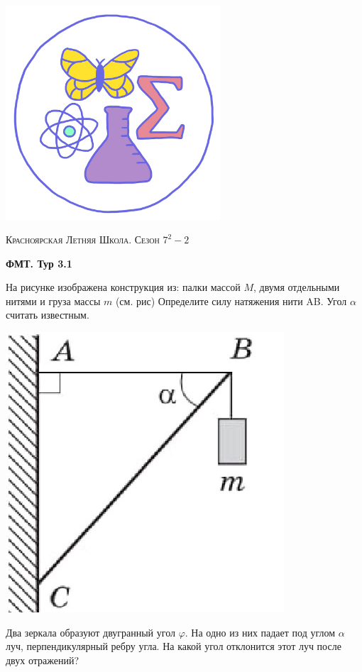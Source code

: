 \colorbox{white!10!}{
    \begin{minipage}{0.2\textwidth}
       \begin{flushleft}
        \includegraphics[width = 0.6\textwidth]{Эмблема.png}
       \end{flushleft}
    \end{minipage}
    \begin{minipage}[t]{0.7 \textwidth}
        \begin{center}
            {\huge \textsc{Красноярская Летняя Школа. Сезон $7^2 - 2$}}
            \vspace{0.25cm}
            
            { \huge \textbf{ФМТ. Тур 3.1}}
        \end{center}
        \vspace{0.05cm}
    \end{minipage}
}

\begin{enumerate}
    \parbox[b]{.7\textwidth}{%
    \item На рисунке изображена конструкция из: палки массой $M$, двумя отдельными нитями и груза массы $m$ (см. рис) 
    Определите силу натяжения нити AB. Угол $\alpha$ считать известным.
    }\hfill\includegraphics[width=.145\textwidth]{pictures/Tur_3.png}
	
 
    \item Два зеркала образуют двугранный угол $\varphi$. На одно из них падает под углом $\alpha$ луч, перпендикулярный ребру угла. На какой угол отклонится этот луч после двух отражений?
\end{enumerate}